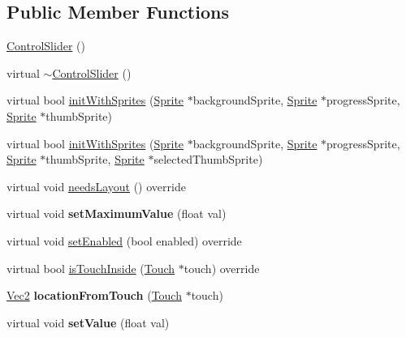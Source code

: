 \subsection*{Public Member Functions}
\begin{DoxyCompactItemize}
\item 
\hyperlink{classControlSlider_a5e8f291dde316511b9fd1b59dc44bb58}{Control\+Slider} ()
\item 
virtual \hyperlink{classControlSlider_a6faea9f9c61f7f59f990a07cc839866a}{$\sim$\+Control\+Slider} ()
\item 
virtual bool \hyperlink{classControlSlider_ad0ff5ce559475048d32b4406a0930da1}{init\+With\+Sprites} (\hyperlink{classSprite}{Sprite} $\ast$background\+Sprite, \hyperlink{classSprite}{Sprite} $\ast$progress\+Sprite, \hyperlink{classSprite}{Sprite} $\ast$thumb\+Sprite)
\item 
virtual bool \hyperlink{classControlSlider_afde1ef921293f21a38dc72f78c0ee485}{init\+With\+Sprites} (\hyperlink{classSprite}{Sprite} $\ast$background\+Sprite, \hyperlink{classSprite}{Sprite} $\ast$progress\+Sprite, \hyperlink{classSprite}{Sprite} $\ast$thumb\+Sprite, \hyperlink{classSprite}{Sprite} $\ast$selected\+Thumb\+Sprite)
\item 
virtual void \hyperlink{classControlSlider_a2325b1df970fb4aff1ccb29aea4a20ea}{needs\+Layout} () override
\item 
\mbox{\label{classControlSlider_a95fa6d7895981d4d628d514c543383fb}} 
virtual void {\bfseries set\+Maximum\+Value} (float val)
\item 
virtual void \hyperlink{classControlSlider_aeb98aed4fbd48f28c55ac6eb7ffd9b30}{set\+Enabled} (bool enabled) override
\item 
virtual bool \hyperlink{classControlSlider_aa2a17ce15e2136612b651ab5c2e4398e}{is\+Touch\+Inside} (\hyperlink{classTouch}{Touch} $\ast$touch) override
\item 
\mbox{\label{classControlSlider_ab3ca93257d357d51795b812064edc734}} 
\hyperlink{classVec2}{Vec2} {\bfseries location\+From\+Touch} (\hyperlink{classTouch}{Touch} $\ast$touch)
\item 
\mbox{\label{classControlSlider_af565dfa1bcd5970aa559dcf56ffe3344}} 
virtual void {\bfseries set\+Value} (float val)
\item 
\mbox{\label{classControlSlider_a23c05a62163b5d9c5dd8abb865c102b7}} 

\end{DoxyCompactItemize}
